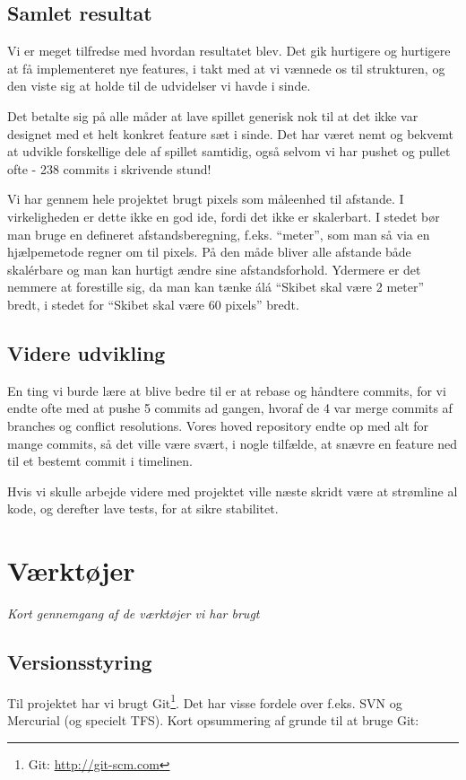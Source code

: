 \documentclass[titlepage,danish]{article}
\begin{document}
\subsection{Samlet resultat}
Vi er meget tilfredse med hvordan resultatet blev. Det gik hurtigere og hurtigere at få
implementeret nye features, i takt med at vi vænnede os til strukturen, og den viste sig at holde
til de udvidelser vi havde i sinde.

Det betalte sig på alle måder at lave spillet generisk nok til at det ikke var designet med et helt
konkret feature sæt i sinde. Det har været nemt og bekvemt at udvikle forskellige dele af spillet
samtidig, også selvom vi har pushet og pullet ofte - 238 commits i skrivende stund! 

Vi har gennem hele projektet brugt pixels som måleenhed til afstande. I virkeligheden er dette ikke
en god ide, fordi det ikke er skalerbart. I stedet bør man bruge en defineret afstandsberegning,
f.eks. ``meter'', som man så via en hjælpemetode regner om til pixels. På den måde bliver alle
afstande både skalérbare og man kan hurtigt ændre sine afstandsforhold. Ydermere er det nemmere at
forestille sig, da man kan tænke álá ``Skibet skal være 2 meter'' bredt, i stedet for ``Skibet skal
være 60 pixels'' bredt.

\subsection{Videre udvikling}
En ting vi burde lære at blive bedre til er at rebase og håndtere commits, for vi endte ofte med
at pushe 5 commits ad gangen, hvoraf de 4 var merge commits af branches og conflict
resolutions. Vores hoved repository endte op med alt for mange commits, så det ville være svært, i
nogle tilfælde, at snævre en feature ned til et bestemt commit i timelinen.

Hvis vi skulle arbejde videre med projektet ville næste skridt være at strømline al kode, og
derefter lave tests, for at sikre stabilitet.

\section{Værktøjer}
\emph{Kort gennemgang af de værktøjer vi har brugt}
\subsection{Versionsstyring}
Til projektet har vi brugt Git\footnote{Git: \url{http://git-scm.com}}. Det har visse fordele over
f.eks. SVN og Mercurial (og specielt TFS). Kort opsummering af grunde til at bruge Git:
\end{document}

